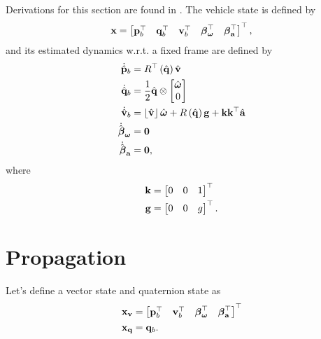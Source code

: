 \documentclass[english]{article}
\begin{document}
Derivations for this section are found in \cite{key-2}. The vehicle state is defined by
\begin{equation}
{\bf x}=\begin{bmatrix}{\bf p}_{b}^{\top} & {\bf q}_{b}^{\top} & {\bf v}_{b}^{\top} & \boldsymbol{\beta}_{\boldsymbol{\omega}}^{\top} & \boldsymbol{\beta}_{{\bf a}}^{\top}\end{bmatrix}^{\top},
\end{equation}
and its estimated dynamics w.r.t. a fixed frame are defined by
\begin{align}
\dot{\hat{{\bf p}}}_b & =R^{\top}\left(\hat{{\bf q}}\right)\hat{{\bf v}}\\
\dot{\hat{{\bf q}}}_b & =\dfrac{1}{2}\hat{{\bf q}}\otimes\begin{bmatrix}\hat{\boldsymbol{\omega}}\\0\end{bmatrix}\\
\dot{\hat{{\bf v}}}_b & =\left\lfloor \hat{{\bf v}}\right\rfloor \hat{\boldsymbol{\omega}}+R\left(\hat{{\bf q}}\right){\bf g}+{\bf k}{\bf k}^{\top}\hat{{\bf a}}\\
\dot{\hat{\boldsymbol{\beta}}}_{\boldsymbol{\omega}} & ={\bf 0}\\
\dot{\hat{\boldsymbol{\beta}}}_{{\bf a}} & ={\bf 0},
\end{align}
where
\begin{align}
{\bf k} & = \begin{bmatrix} 0 & 0 & 1 \end{bmatrix}^{\top}\\
{\bf g} & = \begin{bmatrix} 0 & 0 & g \end{bmatrix}^{\top}.
\end{align}



\section{Propagation}

Let's define a vector state and quaternion state as
\begin{align}
{\bf x}_{\bf v} & = \begin{bmatrix}{\bf p}_{b}^{\top} & {\bf v}_{b}^{\top} & \boldsymbol{\beta}_{\boldsymbol{\omega}}^{\top} & \boldsymbol{\beta}_{{\bf a}}^{\top}\end{bmatrix}^{\top} \\
{\bf x}_{\bf q} & = {\bf q}_{b}.
\end{align}
\end{document}
